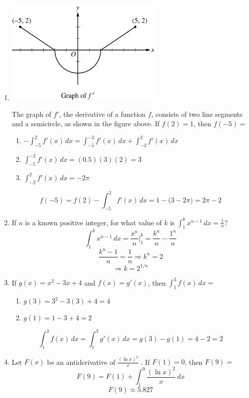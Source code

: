 \documentclass[12pt]{article}
\begin{document}
\begin{enumerate}
    
    \item 
    \begin{center}
        \includegraphics[width=3in]{original-14.png}
    \end{center}
    The graph of $f'$, the derivative of a function $f$, consists of two line segments and a semicircle, as shown in the figure above. If $f(2)=1$, then $f(-5)=$
     \begin{enumerate}
        \item $-\int_{-5}^{2} f'(x) \, dx = \int_{-5}^{-2} f'(x) \, dx + \int_{-2}^{2} f'(x) \, dx$ 
        \item $\int_{-5}^{-2} f'(x) \, dx = (0.5)(3)(2)=3$
        \item $\int_{-2}^{2} f'(x) \, dx = -2\pi$
    \end{enumerate}
    $$f(-5)=f(2)-\int_{-5}^{2} f'(x) \, dx = 1- \big(3 -2\pi \big) = \boxed{2\pi-2}$$
    \item If $n$ is a known positive integer, for what value of $k$ is $\int_{1}^{k} x^{n-1} \,dx = \frac{1}{n}$?
    $$\int_{1}^{k} x^{n-1} \,dx = \frac{x^n}{n} \biggr\rvert_{1}^{k} = \frac{k^n}{n} -\frac{1^n}{n} $$
$$\frac{k^n -1}{n}= \frac{1}{n} \Longrightarrow k^n=2 $$
$$\Longrightarrow \boxed{k= 2^{1/n}}$$

    
    \item If $g(x)=x^2-3x+4$ and $f(x)=g'(x)$, then $\int_{1}^{3} f(x) \, dx =$
    \begin{enumerate}
        \item $g(3)=3^2-3(3)+4=4$
        \item $g(1)=1-3+4=2$
    \end{enumerate}
    $$\int_{1}^{3} f(x) \, dx =\int_{1}^{3} g'(x) \, dx = g(3)-g(1) = 4-2= \boxed{2}$$
    
    \item Let $F(x)$ be an antiderivative of $\frac{(\ln x)^3}{x}$ . If $F(1)=0$, then $F(9)=$
    $$F(9)=F(1) +\int_{1}^{9} \frac{(\ln x)^2}{x} \, dx$$
    $$\boxed{F(9) \approx 5.827}$$
\end{enumerate}
\end{document}
